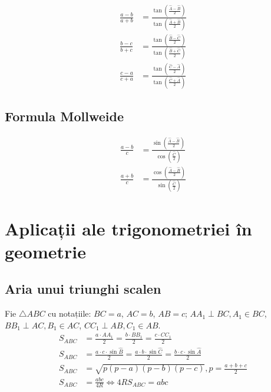 \documentclass[11pt,a4paper]{article}
\begin{document}
\begin{align*}
\frac{a - b}{a + b} &= \frac{\tan\left( \frac{\widehat{A} - \widehat{B}}{2} \right)}{\tan\left( \frac{\widehat{A} + \widehat{B}}{2} \right)} \\
\frac{b - c}{b + c} &= \frac{\tan\left( \frac{\widehat{B} - \widehat{C}}{2} \right)}{\tan\left( \frac{\widehat{B} + \widehat{C}}{2} \right)} \\
\frac{c - a}{c + a} &= \frac{\tan\left( \frac{\widehat{C} - \widehat{A}}{2} \right)}{\tan\left( \frac{\widehat{C} + \widehat{A}}{2} \right)}
\end{align*}

\subsection{Formula Mollweide}

\begin{align*}
\frac{a - b}{c} &= \frac{\sin\left( \frac{\widehat{A} - \widehat{B}}{2} \right)}{\cos\left( \frac{\widehat{C}}{2} \right)} \\
\frac{a + b}{c} &= \frac{\cos\left( \frac{\widehat{A} - \widehat{B}}{2} \right)}{\sin\left( \frac{\widehat{C}}{2} \right)}
\end{align*}
\setcounter{theorem}{0}
\section{Aplicații ale trigonometriei în geometrie}
\subsection{Aria unui triunghi scalen}
Fie $\triangle ABC$ cu notațiile: $BC=a$, $AC=b$, $AB=c$; $AA_1 \perp BC, A_1 \in BC$, $BB_1 \perp AC, B_1 \in AC$, $CC_1 \perp AB, C_1 \in AB$.
\begin{align*}
S_{ABC} &= \frac{a \cdot AA_1}{2} = \frac{b \cdot BB_1}{2} = \frac{c \cdot CC_1}{2}\\
 S_{ABC} &= \frac{a \cdot c \cdot \sin{\widehat{B}}}{2} = \frac{a \cdot b \cdot \sin{\widehat{C}} }{2} = \frac{b \cdot c \cdot \sin{\widehat{A}}}{2} \\
 S_{ABC} &= \sqrt{p(p-a)(p-b)(p-c)}, p = \frac{a+b+c}{2}\\
 S_{ABC} &= \frac{a  b  c}{4R} \Leftrightarrow 4RS_{ABC} = abc
\end{align*}
\end{document}

